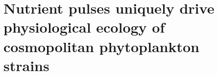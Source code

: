 
\chapter{Nutrient pulses uniquely drive physiological ecology of cosmopolitan phytoplankton strains}
\raggedbottom
\begin{singlespace}

\end{singlespace}

